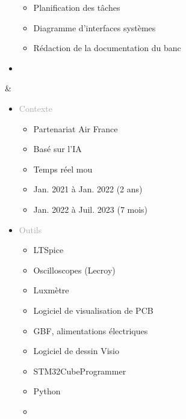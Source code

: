 \documentclass{article}
\begin{document}
\begin{tabular}
\begin{itemize}
\begin{itemize}
            \item \textcolor{gray!80}{Planification des tâches}
            \item \textcolor{gray!80}{Diagramme d'interfaces systèmes}
            \item \textcolor{gray!80}{Rédaction de la documentation du banc}  
        \end{itemize}
        \item \textcolor{darkGray}{}
    \end{itemize}
    &
    \begin{itemize}[label={}, topsep=10pt, partopsep=0pt, itemsep=0.5pt, parsep=2pt]
        \setlength{\itemsep}{10pt} 
        \item \textcolor{darkGray}{Contexte}
        \begin{itemize}
        [label={\textcolor{gray!80}{\checkmark}}, topsep=10pt, partopsep=0pt, itemsep=0.5pt, parsep=2pt] 
            \item \textcolor{gray!80}{Partenariat Air France}
            \item \textcolor{gray!80}{Basé sur l'IA}
            \item \textcolor{gray!80}{Temps réel mou}
            \item \textcolor{gray!80}{Jan. 2021 à Jan. 2022 (2 ans)}
            \item \textcolor{gray!80}{Jan. 2022 à Juil. 2023 (7 mois)}
        \end{itemize}
        \item \textcolor{darkGray}{Outils}
        \begin{itemize}
        [label={\textcolor{gray!80}{\checkmark}}, topsep=10pt, partopsep=0pt, itemsep=0.5pt, parsep=2pt] 
            \item \textcolor{gray!80}{LTSpice}
            \item \textcolor{gray!80}{Oscilloscopes (Lecroy)}
            \item \textcolor{gray!80}{Luxmètre}
            \item \textcolor{gray!80}{Logiciel de visualisation de PCB}
            \item \textcolor{gray!80}{GBF, alimentations électriques}
            \item \textcolor{gray!80}{Logiciel de dessin Visio}
            \item \textcolor{gray!80}{STM32CubeProgrammer}
            \item \textcolor{gray!80}{Python}
            \item[\textcolor{white}{\checkmark}] \textcolor{gray!80}{} %

\end{itemize}
\end{itemize}
\end{tabular}
\end{document}
